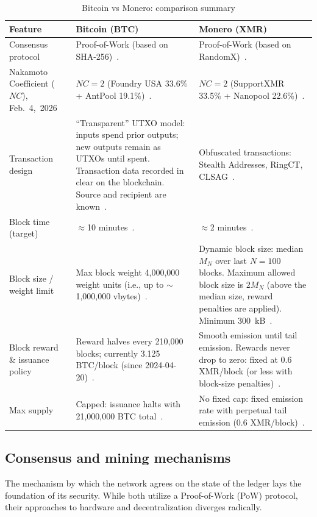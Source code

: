 \documentclass[conference]{IEEEtran}
\begin{document}
\begin{table}[!t]
\caption{Bitcoin vs Monero: comparison summary}
\label{tab:btc_xmr_comparison}
\centering
\footnotesize
\setlength{\tabcolsep}{4pt}
\renewcommand{\arraystretch}{1.15}
\begin{tabular}{p{} p{} p{}}
\hline
\textbf{Feature} & \textbf{Bitcoin (BTC)} & \textbf{Monero (XMR)}\\
\hline
Consensus protocol &
Proof-of-Work (based on SHA-256)~\cite{bitcoin_paper}. &
Proof-of-Work (based on RandomX)~\cite{randomx_design}. \\
\hline
Nakamoto Coefficient ($NC$), Feb.~4,~2026 &
$NC = 2$ (Foundry USA 33.6\% + AntPool 19.1\%)~\cite{btc_pools_hashrateindex}. &
$NC=2$ (SupportXMR 33.5\% + Nanopool 22.6\%)~\cite{xmr_pools_poolbay}. \\
\hline
Transaction design &
``Transparent'' UTXO model: inputs spend prior outputs; new outputs remain as UTXOs until spent. Transaction data recorded in clear on the blockchain. Source and recipient are known~\cite{bitcoin_utxo}. &
Obfuscated transactions: Stealth Addresses, RingCT, CLSAG~\cite{zero_to_monero_2}. \\
\hline
Block time (target) &
$\approx$10 minutes~\cite{btc_supply_wiki}. &
$\approx$2 minutes~\cite{monero_technical_specs}. \\
\hline
Block size / weight limit &
Max block weight 4,000,000 weight units (i.e., up to $\sim$1,000,000 vbytes)~\cite{btc_glossary}. &
Dynamic block size: median $M_N$ over last $N{=}100$ blocks. Maximum allowed block size is $2M_N$ (above the median size, reward penalties are applied). Minimum 300~kB~\cite{zero_to_monero_2}.\\
\hline
Block reward \& issuance policy &
Reward halves every 210{,}000 blocks; currently 3.125 BTC/block (since 2024-04-20)~\cite{btc_supply_wiki}. &
Smooth emission until tail emission. Rewards never drop to zero: fixed at 0.6 XMR/block (or less with block-size penalties)~\cite{monero_technical_specs}. \\
\hline
Max supply &
Capped: issuance halts with 21,000,000 BTC total~\cite{btc_supply_wiki}. &
No fixed cap: fixed emission rate with perpetual tail emission (0.6 XMR/block)~\cite{zero_to_monero_2}. \\
\hline
\end{tabular}
\end{table}

\subsection{Consensus and mining mechanisms}
The mechanism by which the network agrees on the state of the ledger lays the foundation of its security. While both utilize a Proof-of-Work (PoW) protocol, their approaches to hardware and decentralization diverges radically.
\end{document}
